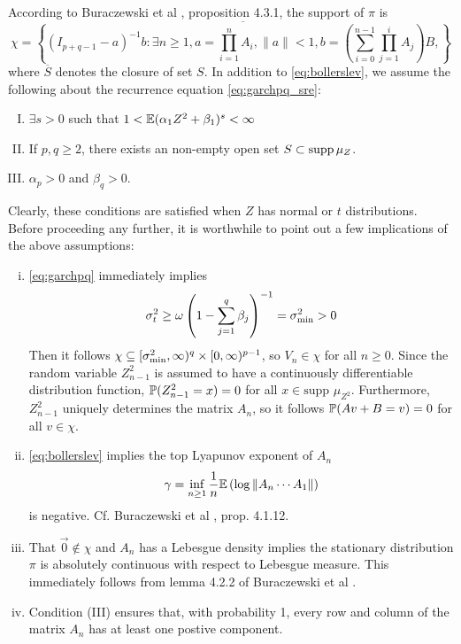 \documentclass[aoas,preprint]{imsart}
\numberwithin{equation}{section}
\theoremstyle{plain}
\begin{document}
According to Buraczewski et al 
\cite{buraczewski:damek:mikosch:2016}, proposition 4.3.1, the support
of $\pi$ is
\[
\chi = \overline{
  \left\{
  (I_{p+q-1} - a)^{-1} b:
  \exists n \geq 1,
  a = \prod_{i=1}^n A_i,
  \|a\| < 1,
  b = \left(\sum_{i=0}^{n-1} \prod_{j=1}^i A_{j}\right) B,
  \right\}
}
\]
where $\overline S$ denotes the closure of set $S$.
In addition to \eqref{eq:bollerslev}, we assume the following about
the recurrence equation \eqref{eq:garchpq_sre}:
\begin{enumerate}[(I)]
\item $\exists s > 0$ such that
  $1 < \E (\alpha_1 Z^2 + \beta_1)^s < \infty$
\item If $p, q \geq 2$, there exists an non-empty open set
  $S \subset \supp \mu_Z$.
\item %
  $\alpha_p > 0$  and $\beta_q > 0$.
\end{enumerate}
Clearly, these conditions are satisfied when $Z$ has normal or $t$
distributions.
Before proceeding any further, it is worthwhile to point out a few
implications of the above assumptions:
\begin{enumerate}[(i)]
\item \eqref{eq:garchpq} immediately implies
  \[
  \sigma_t^2 \geq \omega \left(
    1 - \sum_{j=1}^q \beta_j
  \right)^{-1} = \sigma_{\m}^2 > 0
  \]
  Then it follows
  $\chi \subseteq [\sigma_{\m}^2, \infty)^q \times [0, \infty)^{p-1}$, so
  $V_n \in \chi$ for all $n \geq 0$. Since the random variable
  $Z_{n-1}^2$ is assumed to have a continuously differentiable
  distribution function,
  $\P(Z_{n-1}^2 = x) = 0$ for all $x \in \text{supp } \mu_{Z^2}$.
  Furthermore, $Z_{n-1}^2$ uniquely determines the matrix $A_n$,
  so it follows $\P(A v + B = v) = 0$ for all $v \in \chi$.

\item \eqref{eq:bollerslev} implies the top Lyapunov exponent of $A_n$
  \begin{equation}
    \label{eq:Lyapunov}
    \gamma = \inf_{n \geq 1} {1 \over n}
    \E \left(\log \| A_n \cdots A_1 \| \right)    
  \end{equation}
  is negative. Cf. Buraczewski et al
  \cite{buraczewski:damek:mikosch:2016}, prop. 4.1.12.

\item That $\vec 0 \notin \chi$ and $A_n$ has a Lebesgue density
  implies the stationary distribution $\pi$ is absolutely continuous with
  respect to Lebesgue measure. This immediately follows from lemma
  4.2.2 of Buraczewski et al \cite{buraczewski:damek:mikosch:2016}.

\item Condition (III) ensures that, with probability 1, every row and
  column of the matrix $A_n$ has at least one postive component.

\end{enumerate}
\end{document}

